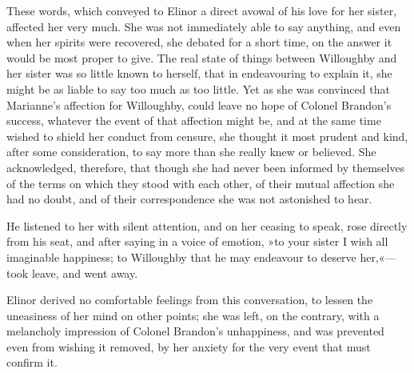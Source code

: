 These words, which conveyed to Elinor a direct avowal of his love for her sister, affected her very much. She was not immediately able to say anything, and even when her spirits were recovered, she debated for a short time, on the answer it would be most proper to give. The real state of things between Willoughby and her sister was so little known to herself, that in endeavouring to explain it, she might be as liable to say too much as too little. Yet as she was convinced that Marianne’s affection for Willoughby, could leave no hope of Colonel Brandon’s success, whatever the event of that affection might be, and at the same time wished to shield her conduct from censure, she thought it most prudent and kind, after some consideration, to say more than she really knew or believed. She acknowledged, therefore, that though she had never been informed by themselves of the terms on which they stood with each other, of their mutual affection she had no doubt, and of their correspondence she was not astonished to hear.

He listened to her with silent attention, and on her ceasing to speak, rose directly from his seat, and after saying in a voice of emotion, »to your sister I wish all imaginable happiness; to Willoughby that he may endeavour to deserve her,«—took leave, and went away.

Elinor derived no comfortable feelings from this conversation, to lessen the uneasiness of her mind on other points; she was left, on the contrary, with a melancholy impression of Colonel Brandon’s unhappiness, and was prevented even from wishing it removed, by her anxiety for the very event that must confirm it.